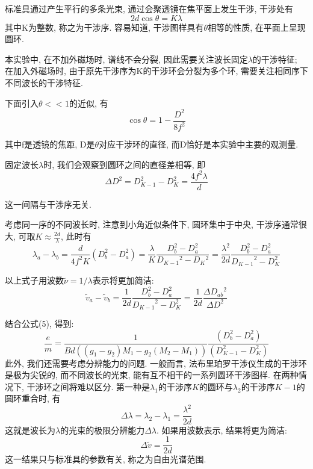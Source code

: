 \documentclass[12pt,a4paper]{article}
\begin{document}
标准具通过产生平行的多条光束, 通过会聚透镜在焦平面上发生干涉, 干涉处有
\begin{equation}
2d\cos{\theta}=K\lambda
\end{equation}
其中K为整数, 称之为干涉序. 容易知道, 干涉图样具有$\theta$相等的性质, 在平面上呈现圆环. 

本实验中, 在不加外磁场时, 谱线不会分裂, 因此需要关注波长固定$\lambda$的干涉特征; 在加入外磁场时, 由于原先干涉序为K的干涉环会分裂为多个环, 需要关注相同序下不同波长的干涉特征. 

下面引入$\theta<<1$的近似, 有
\begin{equation}
\cos{\theta}=1-\frac{D^2}{8f^2}
\end{equation}

其中f是透镜的焦距, D是$\theta$对应干涉环的直径, 而D恰好是本实验中主要的观测量. 

固定波长$\lambda$时, 我们会观察到圆环之间的直径差相等, 即
\begin{equation}
    \Delta D^{2}=D_{K-1}^{2}-D_{K}^{2}=\frac{4 f^{2} \lambda}{d}
\end{equation}

这一间隔与干涉序无关. 

考虑同一序的不同波长时, 注意到小角近似条件下, 圆环集中于中央, 干涉序通常很大, 可取$K\approx \frac{2d}{\lambda}$, 
此时有
\begin{equation}
    \lambda_{a}-\lambda_{b}=\frac{d}{4 f^{2} K}\left(D_{b}^{2}-D_{a}^{2}\right)=\frac{\lambda}{K} \frac{D_{b}^{2}-D_{a}^{2}}{D_{K-1}{ }^{2}-D_{K}{ }^{2}}
    =\frac{\lambda^{2}}{2 d} \frac{D_{b}^{2}-D_{a}^{2}}{{D_{K-1}}^{2}-D_{K}^{2}}
\end{equation}

以上式子用波数$\widetilde{\nu}=1/\lambda$表示将更加简洁: 
\begin{equation}
    \widetilde{v}_{a}-\widetilde{v}_{b}=\frac{1}{2 d} \frac{D_{b}^{2}-D_{a}^{2}}{{D_{K-1}}^{2}-D_{K}^{2}}=\frac{1}{2 d} \frac{\Delta D_{a b}{ }^{2}}{\Delta D^{2}}
\end{equation}

结合公式(5), 得到:
\begin{equation}
    \frac{e}{m}=\frac{1}{B d\left(\left(g_{1}-g_{2}\right) M_{1}-g_{2}\left(M_{2}-M_{1}\right)\right)} \frac{\left(D_{b}^{2}-D_{a}^{2}\right)}{\left(D_{K-1}^{2}-D_{K}^{2}\right)}
\end{equation}
此外, 我们还需要考虑分辨能力的问题. 一般而言, 法布里珀罗干涉仪生成的干涉环是极为尖锐的, 而不同波长的光束, 能有互不相干的一系列圆环干涉图样. 
在两种情况下, 干涉环之间将难以区分. 第一种是$\lambda_1$的干涉序$K$的圆环与$\lambda_2$的干涉序$K-1$的圆环重合时, 有
\begin{equation}
\Delta \lambda=\lambda_{2}-\lambda_{1}=\frac{\lambda^{2}}{2 d}
\end{equation}
这就是波长为$\lambda$的光束的极限分辨能力$\Delta \lambda$. 如果用波数表示, 结果将更为简洁: 
\begin{equation}
\Delta \tilde{v}=\frac{1}{2 d}
\end{equation}
这一结果只与标准具的参数有关, 称之为自由光谱范围. 
\end{document}
